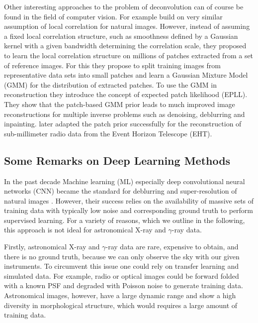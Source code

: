 \documentclass[twocolumn]{aastex631}
\newcommand{\gammaray}{$\gamma$-ray\xspace}
\newcommand{\xray}{X-ray\xspace}
\newcommand{\todo}[1]{\textcolor{red}{TODO: #1}\PackageWarning{TODO:}{#1!}}
\begin{document}
    Other interesting approaches to the problem of deconvolution can of course be found in the field of computer vision. For example \cite{Zoran2011} build on very similar assumption of local correlation for natural images. However, instead of assuming a fixed local correlation structure, such as smoothness defined by a Gaussian kernel with a given bandwidth determining the correlation scale,
    they proposed to learn the local correlation structure on millions of patches extracted from a set of reference images. For this they propose to split training images from representative data sets into small patches and learn a  Gaussian Mixture Model (GMM) %
    for the distribution of extracted patches. To use the GMM in reconstruction they introduce the concept of expected patch likelihood (EPLL). They show that the patch-based GMM prior leads to much improved image reconstructions for multiple inverse problems such as denoising, deblurring and inpainting. \cite{Bouman2016} later adapted the patch prior successfully for the reconstruction of sub-millimeter radio data from the Event Horizon Telescope (EHT).
    
    


    \subsection{Some Remarks on Deep Learning Methods}
    In the past decade Machine learning (ML) especially deep convolutional neural networks (CNN) became the standard for deblurring and super-resolution of natural images \citep{Zhang2022}. However, their success relies on the availability of massive sets of training data with typically low noise and corresponding ground truth to perform supervised learning. For a variety of reasons, which we outline in the following, this approach is not ideal for astronomical \xray and \gammaray data.
    
    Firstly, astronomical \xray and \gammaray data are rare, expensive to obtain, and there is no ground truth, because we can only observe the sky with our given instruments. To circumvent this issue one could rely on transfer learning and simulated data. For example, radio or optical images could be forward folded with a known PSF and degraded with Poisson noise to generate training data.  Astronomical images, however, have a large dynamic range and show a high diversity in morphological structure, which would requires a large amount of training data.  
\end{document}
